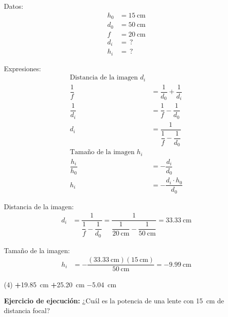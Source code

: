 \documentclass[12pt, letter]{exam}
\begin{document}
\begin{questions}
    \begin{minipage}[t]{0.35\linewidth}
    Datos: 
    \begin{align*}
    h_{0} &= \SI{15}{\centi\meter} \\
    d_{0} &= \SI{50}{\centi\meter} \\
    f &= \SI{20}{\centi\meter} \\
    d_{i} &= \, ? \\
    h_{i} &= \, ?
    \end{align*}
    \end{minipage}
    \hspace{1cm}
    \begin{minipage}[t]{0.4\linewidth}
    Expresiones:
    \begin{align*}
    \text{Distancia de la imagen } d_{i} \\[0.3em]
    \dfrac{1}{f} &= \dfrac{1}{d_{0}} + \dfrac{1}{d_{i}} \\[0.3em]
    \dfrac{1}{d_{i}} &= \dfrac{1}{f} - \dfrac{1}{d_{0}} \\[0.4em]
    d_{i} &= \dfrac{1}{\dfrac{1}{f} - \dfrac{1}{d_{0}}} \\[0.5em]
    \text{Tamaño de la imagen } h_{i} \\[0.3em]
    \dfrac{h_{i}}{h_{0}} &= - \dfrac{d_{i}}{d_{0}} \\[0.5em]
    h_{i} &= - \dfrac{d_{i} \cdot h_{0}}{d_{0}} 
    \end{align*}
    \end{minipage}

    Distancia de la imagen:
    \begin{align*}
    d_{i} &= \dfrac{1}{\dfrac{1}{f} - \dfrac{1}{d_{0}}} = \dfrac{1}{\dfrac{1}{\SI{20}{\centi\meter}} - \dfrac{1}{\SI{50}{\centi\meter}}} = \SI{33.33}{\centi\meter}
    \end{align*}

    Tamaño de la imagen:
    \begin{align*}
    h_{i} &= - \dfrac{(\SI{33.33}{\centi\meter})(\SI{15}{\centi\meter})}{\SI{50}{\centi\meter}} = -\SI{9.99}{\centi\meter}
    \end{align*}
    
    \begin{tasks}(4)
        \task \textbf{+}\SI{19.85}{\centi\meter}
        \task \textbf{+}\SI{25.20}{\centi\meter}
        \task \SI{-5.04}{\centi\meter}
        \task {}
    \end{tasks}

    \setcounter{question}{19} \question \textbf{Ejercicio de ejecución: } ¿Cuál es la potencia de una lente con \SI{15}{\centi\meter} de distancia focal?


\end{questions}
\end{document}
